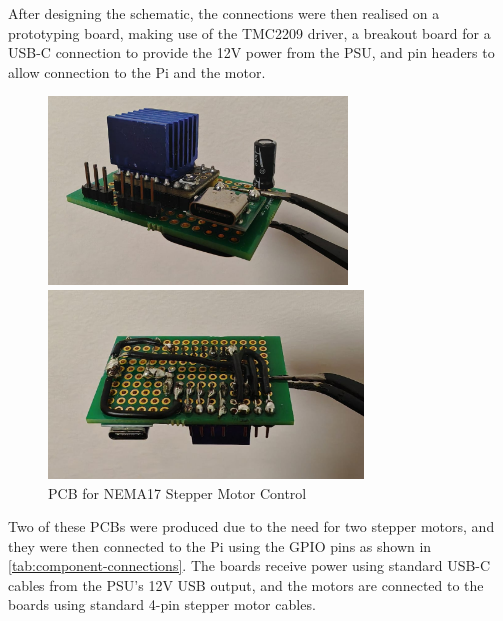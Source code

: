 After designing the schematic, the connections were then realised on a prototyping board, making use of the TMC2209 driver, a breakout board for a USB-C connection to provide the 12V power from the PSU, and pin headers to allow connection to the Pi and the motor.

\begin{figure}[H]
    \hfill
    \begin{minipage}[t]{0.45\textwidth}
      \centering
      \includegraphics[width=\textwidth,height=5cm, keepaspectratio]{imgs/real/tmc2209-0.jpeg}
    \end{minipage}
    \hfill
    \begin{minipage}[t]{0.45\textwidth}
      \centering
      \includegraphics[width=\textwidth,height=5cm, keepaspectratio]{imgs/real/tmc2209-1.jpeg}
    \end{minipage}
    \hfill
    \caption{PCB for NEMA17 Stepper Motor Control}
    \label{fig:tmc2209-pcb}
\end{figure}

Two of these PCBs were produced due to the need for two stepper motors, and they were then connected to the Pi using the GPIO pins as shown in \autoref{tab:component-connections}. The boards receive power using standard USB-C cables from the PSU's 12V USB output, and the motors are connected to the boards using standard 4-pin stepper motor cables.